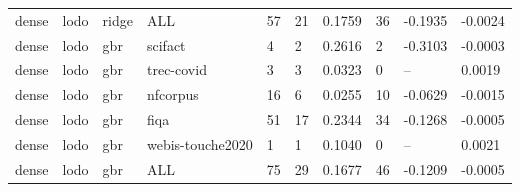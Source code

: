 \begin{table}[t]
\begin{tabular}{llllllllll}
dense & lodo & ridge & ALL & 57 & 21 & 0.1759 & 36 & -0.1935 & -0.0024 \\
dense & lodo & gbr & scifact & 4 & 2 & 0.2616 & 2 & -0.3103 & -0.0003 \\
dense & lodo & gbr & trec-covid & 3 & 3 & 0.0323 & 0 & -- & 0.0019 \\
dense & lodo & gbr & nfcorpus & 16 & 6 & 0.0255 & 10 & -0.0629 & -0.0015 \\
dense & lodo & gbr & fiqa & 51 & 17 & 0.2344 & 34 & -0.1268 & -0.0005 \\
dense & lodo & gbr & webis-touche2020 & 1 & 1 & 0.1040 & 0 & -- & 0.0021 \\
dense & lodo & gbr & ALL & 75 & 29 & 0.1677 & 46 & -0.1209 & -0.0005 \\
\bottomrule
\end{tabular}
\end{table}
